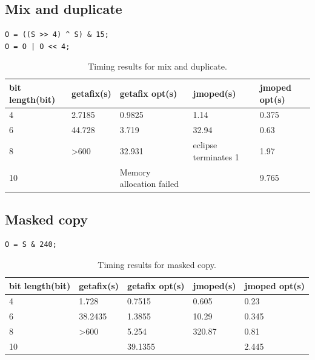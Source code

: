 \subsection{Mix and duplicate}

\lstset{language=C}  
\begin{lstlisting}[caption={Mix and duplicate test program at 8 bits.},label=lst:mix]
O = ((S >> 4) ^ S) & 15;
O = O | O << 4;
\end{lstlisting}

\begin{table}[htbp]
\begin{tabular}{|l|l|l|l|l|}
\hline
{bit length(bit)} & getafix(s) & {getafix opt(s)} & jmoped(s) & {jmoped opt(s)} \\ \hline
4 & {2.7185} & 0.9825 & {1.14} & 0.375 \\ \hline
6 & {44.728} & 3.719 & {32.94} & 0.63 \\ \hline
8 & \textgreater 600 & 32.931 & eclipse terminates 1 & 1.97 \\ \hline
10 &  & {Memory allocation failed} &  & 9.765 \\ \hline
\end{tabular}
\caption{Timing results for mix and duplicate.}
\label{tbl:mix}
\end{table}

\subsection{Masked copy}

\lstset{language=C}  
\begin{lstlisting}[caption={Masked copy test program at 8 bits.},label=lst:masked]
O = S & 240;
\end{lstlisting}

\begin{table}[htbp]
\begin{tabular}{|l|l|l|l|l|}
\hline
{bit length(bit)} & getafix(s) & {getafix opt(s)} & jmoped(s) & {jmoped opt(s)} \\ \hline
4 & 1.728 & 0.7515 & 0.605 & 0.23 \\ \hline
6 & 38.2435 & 1.3855 & 10.29 & 0.345 \\ \hline
8 & \textgreater 600 & 5.254 & 320.87 & 0.81 \\ \hline
10 &  & 39.1355 &  & 2.445 \\ \hline
\end{tabular}
\caption{Timing results for masked copy.}
\label{tbl:masked}
\end{table}

